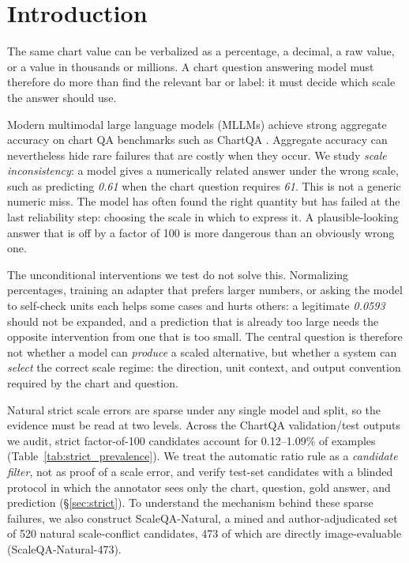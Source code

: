 \section{Introduction}

The same chart value can be verbalized as a percentage, a decimal, a raw value, or a value in thousands or millions. A chart question answering model must therefore do more than find the relevant bar or label: it must decide which scale the answer should use.

Modern multimodal large language models (MLLMs) achieve strong aggregate accuracy on chart QA benchmarks such as ChartQA \citep{masry2022chartqa}. Aggregate accuracy can nevertheless hide rare failures that are costly when they occur. We study \emph{scale inconsistency}: a model gives a numerically related answer under the wrong scale, such as predicting \textit{0.61} when the chart question requires \textit{61}. This is not a generic numeric miss. The model has often found the right quantity but has failed at the last reliability step: choosing the scale in which to express it. A plausible-looking answer that is off by a factor of 100 is more dangerous than an obviously wrong one.

The unconditional interventions we test do not solve this. Normalizing percentages, training an adapter that prefers larger numbers, or asking the model to self-check units each helps some cases and hurts others: a legitimate \textit{0.0593} should not be expanded, and a prediction that is already too large needs the opposite intervention from one that is too small. The central question is therefore not whether a model can \emph{produce} a scaled alternative, but whether a system can \emph{select} the correct scale regime: the direction, unit context, and output convention required by the chart and question.

Natural strict scale errors are sparse under any single model and split, so the evidence must be read at two levels. Across the ChartQA validation/test outputs we audit, strict factor-of-100 candidates account for 0.12--1.09\% of examples (Table~\ref{tab:strict_prevalence}). We treat the automatic ratio rule as a \emph{candidate filter}, not as proof of a scale error, and verify test-set candidates with a blinded protocol in which the annotator sees only the chart, question, gold answer, and prediction (\S\ref{sec:strict}). To understand the mechanism behind these sparse failures, we also construct ScaleQA-Natural, a mined and author-adjudicated set of 520 natural scale-conflict candidates, 473 of which are directly image-evaluable (ScaleQA-Natural-473).

